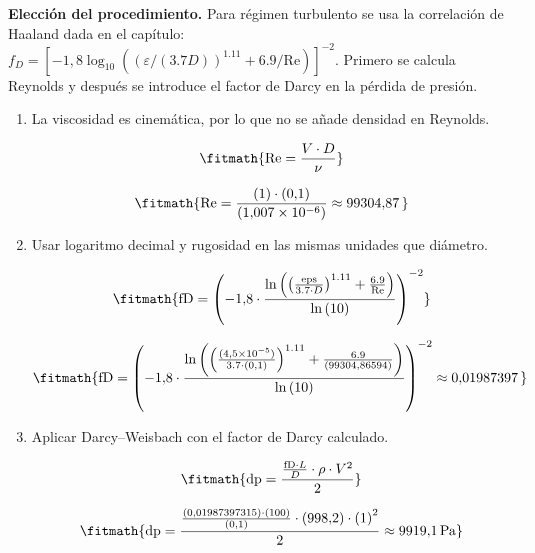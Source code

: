 \noindent\textbf{Elección del procedimiento.} Para régimen turbulento se usa la correlación de Haaland dada en el capítulo: $f_D=[-1{,}8\log_{10}((\varepsilon/(3.7D))^{1.11}+6.9/\mathrm{Re})]^{-2}$. Primero se calcula Reynolds y después se introduce el factor de Darcy en la pérdida de presión.

\begin{enumerate}

\item La viscosidad es cinemática, por lo que no se añade densidad en Reynolds.

\[\fitmath{\mathrm{Re}=\frac{V\cdot D}{\nu}}\]

\[\fitmath{\mathrm{Re}=\frac{(1)\cdot (0{,}1)}{(1{,}007\times10^{-6})}\approx 99304{,}87\,}\]

\item Usar logaritmo decimal y rugosidad en las mismas unidades que diámetro.

\[\fitmath{\mathrm{fD}={\left(-1{,}8\cdot \frac{\ln\left({\left(\frac{\mathrm{eps}}{3.7\cdot D}\right)}^{1.11}+\frac{6.9}{\mathrm{Re}}\right)}{\ln\left(10\right)}\right)}^{-2}}\]

\[\fitmath{\mathrm{fD}={\left(-1{,}8\cdot \frac{\ln\left({\left(\frac{(4{,}5\times10^{-5})}{3.7\cdot (0{,}1)}\right)}^{1.11}+\frac{6.9}{(99304{,}86594)}\right)}{\ln\left(10\right)}\right)}^{-2}\approx 0{,}01987397\,}\]

\item Aplicar Darcy--Weisbach con el factor de Darcy calculado.

\[\fitmath{\mathrm{dp}=\frac{\frac{\mathrm{fD}\cdot L}{D}\cdot \rho\cdot {V}^{2}}{2}}\]

\[\fitmath{\mathrm{dp}=\frac{\frac{(0{,}01987397315)\cdot (100)}{(0{,}1)}\cdot (998{,}2)\cdot {(1)}^{2}}{2}\approx 9919{,}1\,\mathrm{Pa}}\]

\end{enumerate}
